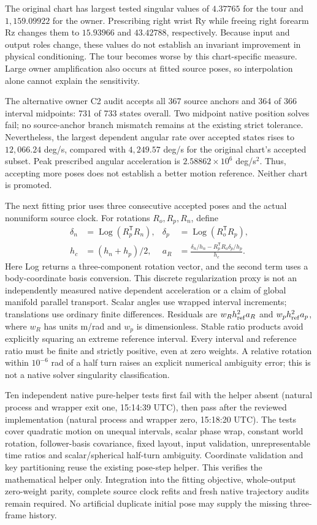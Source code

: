 \documentclass[11pt,a4paper]{article}
\begin{document}
The original chart has largest tested singular values of $4.37765$ for the
tour and $1,159.09922$ for the owner. Prescribing right wrist Ry while freeing
right forearm Rz changes them to $15.93966$ and $43.42788$, respectively.
Because input and output roles change, these values do not establish an
invariant improvement in physical conditioning. The tour becomes worse by
this chart-specific measure. Large owner amplification also occurs at fitted
source poses, so interpolation alone cannot explain the sensitivity.

The alternative owner C2 audit accepts all 367 source anchors and 364 of
366 interval midpoints: 731 of 733 states overall. Two midpoint native
position solves fail; no source-anchor branch mismatch remains at the
existing strict tolerance. Nevertheless, the largest dependent angular rate
over accepted states rises to $12,066.24$ deg/s, compared with $4,249.57$
deg/s for the original chart's accepted subset. Peak prescribed angular
acceleration is $2.58862\times10^6$ deg/s$^2$. Thus, accepting more poses
does not establish a better motion reference. Neither chart is promoted.

The next fitting prior uses three consecutive accepted poses and the actual
nonuniform source clock. For rotations $R_o,R_p,R_n$, define
\begin{align}
 \delta_n &= \operatorname{Log}(R_p^\mathsf{T}R_n), &
 \delta_p &= \operatorname{Log}(R_o^\mathsf{T}R_p),\\
 h_c &= (h_n+h_p)/2, &
 a_R &= \frac{\delta_n/h_n-R_p^\mathsf{T}R_o\delta_p/h_p}{h_c}.
\end{align}
Here Log returns a three-component rotation vector, and the second term
uses a body-coordinate basis conversion. This discrete regularization proxy
is not an independently measured native dependent acceleration or a claim
of global manifold parallel transport. Scalar angles use wrapped interval
increments; translations use ordinary finite differences. Residuals are
$w_R h_{\rm ref}^2 a_R$ and $w_p h_{\rm ref}^2 a_p$, where $w_R$ has units
m/rad and $w_p$ is dimensionless. Stable ratio products avoid explicitly
squaring an extreme reference interval. Every interval and reference ratio
must be finite and strictly positive, even at zero weights. A relative
rotation within $10^{-6}$ rad of a half turn raises an explicit numerical
ambiguity error; this is not a native solver singularity classification.

Ten independent native pure-helper tests first fail with the helper absent
(natural process and wrapper exit one, 15:14:39 UTC), then pass after the
reviewed implementation (natural process and wrapper zero, 15:18:20 UTC).
The tests cover quadratic motion on unequal intervals, scalar phase wrap,
constant world rotation, follower-basis covariance, fixed layout, input
validation, unrepresentable time ratios and scalar/spherical half-turn
ambiguity. Coordinate validation and key partitioning reuse the existing
pose-step helper. This verifies the mathematical helper only. Integration
into the fitting objective, whole-output zero-weight parity, complete source
clock refits and fresh native trajectory audits remain required. No artificial
duplicate initial pose may supply the missing three-frame history.
\end{document}
